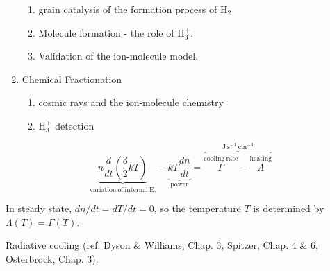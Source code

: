 \begin{enumerate}
\begin{enumerate} 
\item \label{item:molec_grain} grain catalysis of the formation process of  H$_2$
\item \label{item:molec_H3+}Molecule formation - the
role of H$_3^+$.
\item \label{item:molec_valid} Validation of the ion-molecule model.
\end{enumerate}
\item \label{item:fractio} Chemical Fractionation
\begin{enumerate} 
\item cosmic rays and the ion-molecule chemistry
\item H$_3^+$ detection 
\end{enumerate}
\end{enumerate}


\renewcommand\labelitemi{\textcolor{blue}{$\bullet$}}  
\renewcommand\normalcolor{\color{blue}}  %

\renewcommand\labelitemi{\textcolor{blue}{$\bullet$}}  
\renewcommand\Black{\color{black}}        %
\renewcommand\labelitemii{\textcolor{DarkGreen}{$\star$}}  
\color{black}                             %

\LogoOff
\bgclear
\pagecolor{white}



\centering

\[  \underbrace{n \frac{d}{dt} \left( \frac{3}{2} k T
  \right)}_{\mathrm{variation ~of ~ internal ~E.}} -
\underbrace{kT\frac{dn}{dt}}_{\mathrm{power}}
 = \overbrace{
\stackrel{\mathrm{cooling ~rate}}{\Gamma}  -
\stackrel{\mathrm{heating}}{\Lambda}}^{\mathrm{J~s^{-1}~cm^{-3}}}\]

\raggedright
In steady state, $dn/dt = dT/dt = 0$, so the temperature $T$
is determined by  $\Lambda(T)  = \Gamma(T) $.




Radiative cooling (ref.  Dyson \& Williams, Chap. 3, Spitzer, Chap. 4 \&
6, Osterbrock, Chap. 3). \medskip


